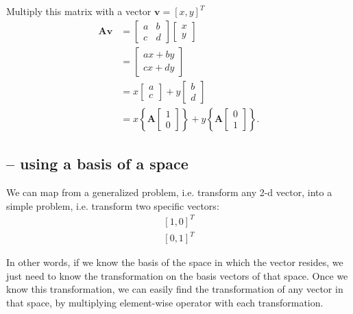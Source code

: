 Multiply this matrix with a vector $\mathbf{v} = [x, y]^T$
\begin{equation}
\begin{aligned}
\mathbf{A}\mathbf{v} & = \begin{bmatrix}a & b \\ c & d\end{bmatrix}\begin{bmatrix}x \\ y\end{bmatrix} \\
& = \begin{bmatrix}ax+by\\ cx+dy\end{bmatrix} \\
& = x\begin{bmatrix}a \\ c\end{bmatrix} + y\begin{bmatrix}b \\d\end{bmatrix} \\
& = x\left\{\mathbf{A}\begin{bmatrix}1\\0\end{bmatrix}\right\} + y\left\{\mathbf{A}\begin{bmatrix}0\\1\end{bmatrix}\right\}.
\end{aligned}
\end{equation}

\subsection{-- using a basis of a space}
\label{sec:basis-of-a-space}

We can map from a generalized problem, i.e. transform any 2-d vector, into a
simple problem, i.e. transform two specific vectors:
\begin{equation}
\begin{split}
[1, 0]^T \\
[0, 1]^T
\end{split}
\end{equation}

In other words, if we know the basis of the space in which the vector resides,
we just need to know the transformation on the basis vectors of that space. Once
we know this transformation, we can easily find the transformation of any vector
in that space, by multiplying element-wise operator with each transformation.

